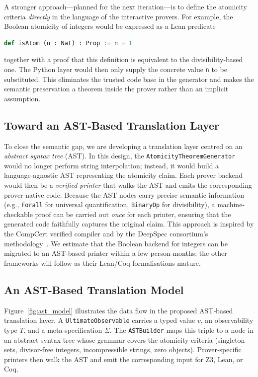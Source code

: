 A stronger approach—planned for the next iteration—is to define the
atomicity criteria \emph{directly} in the language of the interactive
provers.  For example, the Boolean atomicity of integers would be
expressed as a Lean predicate
\begin{lstlisting}[language=Python]
def isAtom (n : Nat) : Prop := n = 1
\end{lstlisting}
together with a proof that this definition is equivalent to the
divisibility‑based one.  The Python layer would then only supply the
concrete value \texttt{n} to be substituted.  This eliminates the
trusted code base in the generator and makes the semantic preservation
a theorem inside the prover rather than an implicit assumption.

\subsection{Toward an AST‑Based Translation Layer}

To close the semantic gap, we are developing a translation layer
centred on an \emph{abstract syntax tree} (AST).  In this design,
the \texttt{AtomicityTheoremGenerator} would no longer perform string
interpolation; instead, it would build a language‑agnostic AST
representing the atomicity claim.  Each prover backend would then
be a \emph{verified printer} that walks the AST and emits the
corresponding prover‑native code.  Because the AST nodes carry
precise semantic information (e.g., \texttt{Forall} for universal
quantification, \texttt{BinaryOp} for divisibility), a machine‑
checkable proof can be carried out \emph{once} for each printer,
ensuring that the generated code faithfully captures the original
claim.  This approach is inspired by the CompCert verified compiler
and by the DeepSpec consortium's methodology~\cite{deepspec2016,leroy2009coq}.
We estimate that the Boolean backend for integers can be migrated
to an AST‑based printer within a few person‑months; the other
frameworks will follow as their Lean/Coq formalisations mature.

\subsection{An AST‑Based Translation Model}

Figure~\ref{fig:ast_model} illustrates the data flow in the proposed
AST‑based translation layer.  A \texttt{UltimateObservable} carries
a typed value $v$, an observability type $T$, and a meta‑specification
$\Sigma$.  The \texttt{ASTBuilder} maps this triple to a node in an
abstract syntax tree whose grammar covers the atomicity criteria
(singleton sets, divisor‑free integers, incompressible strings, zero
objects).  Prover‑specific printers then walk the AST and emit the
corresponding input for Z3, Lean, or Coq.

